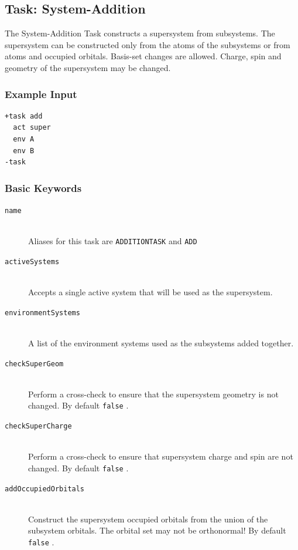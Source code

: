 \documentclass[bibliography=totocnumbered,a4paper,10pt,oneside]{scrbook}
\newcommand{\ttt}[1]{%
  \begingroup\setlength{\fboxsep}{1pt}%
  \colorbox{serenity-green!30}{\texttt{\hspace*{2pt}\vphantom{(g}#1\hspace*{2pt}}}%
  \endgroup
}
\begin{document}
\subsection{Task: System-Addition}\label{task: addition}
The System-Addition Task constructs a supersystem from subsystems. The supersystem can be constructed only from the atoms of the subsystems or from atoms and occupied orbitals. Basis-set changes are allowed. Charge, spin and geometry of the supersystem may be changed.
\subsubsection{Example Input}
\begin{lstlisting}
+task add
  act super
  env A
  env B
-task
\end{lstlisting}
\subsubsection{Basic Keywords}
\begin{description}
	\item[\texttt{name}]\hfill \\
	Aliases for this task are \ttt{ADDITIONTASK} and \ttt{ADD}
	\item[\texttt{activeSystems}]\hfill \\
	Accepts a single active system that will be used as the supersystem.
	\item[\texttt{environmentSystems}]\hfill \\
	A list of the environment systems used as the subsystems added together.
	\item[\texttt{checkSuperGeom}]\hfill \\
	Perform a cross-check to ensure that the supersystem geometry is not changed. By default \ttt{false}.
	\item[\texttt{checkSuperCharge}]\hfill \\
	Perform a cross-check to ensure that supersystem charge and spin are not changed. By default \ttt{false}.
	\item[\texttt{addOccupiedOrbitals}]\hfill \\
	Construct the supersystem occupied orbitals from the union of the subsystem orbitals. The orbital set may not be orthonormal! By default \ttt{false}.
\end{description}
\end{document}
